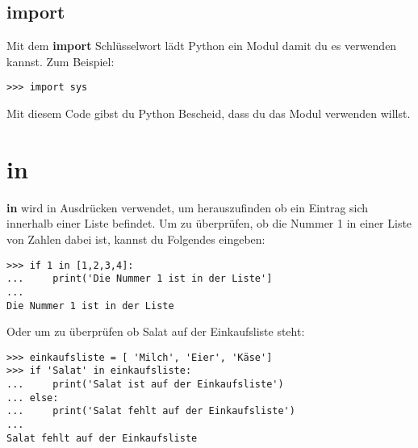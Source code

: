 \subsection*{import}

Mit dem \textbf{import} Schlüsselwort lädt Python ein Modul damit du es verwenden kannst. Zum Beispiel:

\begin{Verbatim}[frame=single]
>>> import sys
\end{Verbatim}

Mit diesem Code gibst du Python Bescheid, dass du das Modul  verwenden willst.

\section*{in}

\textbf{in} wird in Ausdrücken verwendet, um herauszufinden ob ein Eintrag sich innerhalb einer Liste befindet. Um zu überprüfen, ob die Nummer 1 in einer Liste von Zahlen dabei ist, kannst du Folgendes eingeben:

\begin{Verbatim}[frame=single]
>>> if 1 in [1,2,3,4]:
...     print('Die Nummer 1 ist in der Liste']
...
Die Nummer 1 ist in der Liste
\end{Verbatim}

\noindent
Oder um zu überprüfen ob Salat auf der Einkaufsliste steht:

\begin{Verbatim}[frame=single]
>>> einkaufsliste = [ 'Milch', 'Eier', 'Käse']
>>> if 'Salat' in einkaufsliste:
...     print('Salat ist auf der Einkaufsliste')
... else:
...     print('Salat fehlt auf der Einkaufsliste')
...
Salat fehlt auf der Einkaufsliste
\end{Verbatim}

